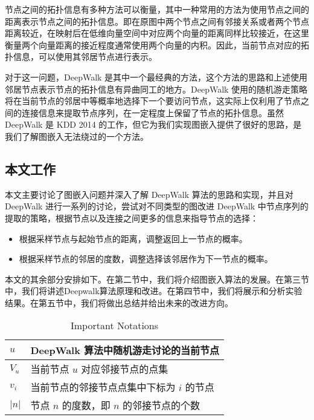 \documentclass{ctexart}
\begin{document}
节点之间的拓扑信息有多种方法可以衡量，其中一种常用的方法为使用节点之间的距离表示节点之间的拓扑信息。即在原图中两个节点之间有邻接关系或者两个节点距离较近，在映射后在低维向量空间中对应两个向量的距离同样比较接近，在这里衡量两个向量距离的接近程度通常使用两个向量的内积。因此，当前节点对应的拓扑信息，可以使用其邻居节点进行表示。


对于这一问题，DeepWalk 是其中一个最经典的方法，这个方法的思路和上述使用邻居节点表示节点的拓扑信息有异曲同工的地方。DeepWalk 使用的随机游走策略将在当前节点的邻居中等概率地选择下一个要访问节点，这实际上仅利用了节点之间的连接信息来提取节点序列，在一定程度上保留了节点的拓扑信息。虽然 DeepWalk\cite{perozzi2014deepwalk} 是 KDD 2014 的工作，但它为我们实现图嵌入提供了很好的思路，是我们了解图嵌入无法绕过的一个方法。

\subsection{本文工作}

本文主要讨论了图嵌入问题并深入了解 DeepWalk 算法的思路和实现，并且对 DeepWalk 进行一系列的讨论，尝试对不同类型的图改进 DeepWalk 中节点序列的提取的策略，根据节点以及连接之间更多的信息来指导节点的选择：

\begin{itemize}
    \item 根据采样节点与起始节点的距离，调整返回上一节点的概率。
    \item 根据采样节点的邻居的度数，调整选择该邻居作为下一节点的概率。
\end{itemize}

本文的其余部分安排如下。在第二节中，我们将介绍图嵌入算法的发展。在第三节中，我们将讲述Deepwalk算法原理和改进。在第四节中，我们将展示和分析实验结果。在第五节中，我们将做出总结并给出未来的改进方向。

\begin{table}[!t]
\renewcommand{\arraystretch}{1.1}
\caption{Important Notations}
\label{notations}
\centering
\begin{tabular}{|l|p{}|}
    \hline
    \(u\) & DeepWalk 算法中随机游走讨论的当前节点 \\
    \hline
    \(V_u\) & 当前节点 \(u\) 对应邻接节点的点集 \\
    \hline
    \(v_i\) & 当前节点的邻接节点点集中下标为 \(i\) 的节点 \\
    \hline
    \(|n|\) & 节点 \(n\) 的度数，即 \(n\) 的邻接节点的个数 \\
    \hline
\end{tabular}
\end{table}
\end{document}
